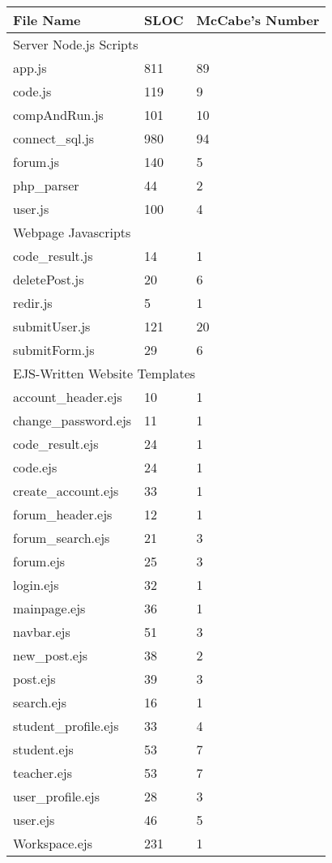 \begin{tabular}{|l|l|l|}
  \hline
  File Name & SLOC & McCabe's Number\\
  \hline\hline
  \multicolumn{3}{l}{Server Node.js Scripts}\\
  \hline\hline
  app.js & 811 & 89\\
  \hline
  code.js & 119 & 9\\
  \hline
  compAndRun.js & 101 & 10\\
  \hline
  connect\_sql.js & 980 & 94\\
  \hline
  forum.js & 140 & 5\\
  \hline
  php\_parser & 44 & 2\\
  \hline
  user.js & 100 & 4\\
  \hline\hline
  \multicolumn{3}{l}{Webpage Javascripts}\\
  \hline\hline
  code\_result.js & 14 & 1\\
  \hline
  deletePost.js & 20 & 6\\
  \hline
  redir.js & 5 & 1\\
  \hline
  submitUser.js & 121 & 20\\
  \hline
  submitForm.js & 29 & 6\\
  \hline\hline
  \multicolumn{3}{l}{EJS-Written Website Templates}\\
  \hline\hline
  account\_header.ejs & 10 & 1\\
  \hline
  change\_password.ejs & 11 & 1\\
  \hline
  code\_result.ejs & 24 & 1\\
  \hline
  code.ejs & 24 & 1\\
  \hline
  create\_account.ejs & 33 & 1\\
  \hline
  forum\_header.ejs & 12 & 1\\
  \hline
  forum\_search.ejs & 21 & 3\\
  \hline
  forum.ejs & 25 & 3\\
  \hline
  login.ejs & 32 & 1\\
  \hline
  mainpage.ejs & 36 & 1\\
  \hline
  navbar.ejs & 51 & 3\\
  \hline
  new\_post.ejs & 38 & 2\\
  \hline
  post.ejs & 39 & 3\\
  \hline
  search.ejs & 16 & 1\\
  \hline
  student\_profile.ejs & 33 & 4\\
  \hline
  student.ejs & 53 & 7\\
  \hline
  teacher.ejs & 53 & 7\\
  \hline
  user\_profile.ejs & 28 & 3\\
  \hline
  user.ejs & 46 & 5 \\
  \hline
  Workspace.ejs & 231 & 1\\
  \hline
\end{tabular}

